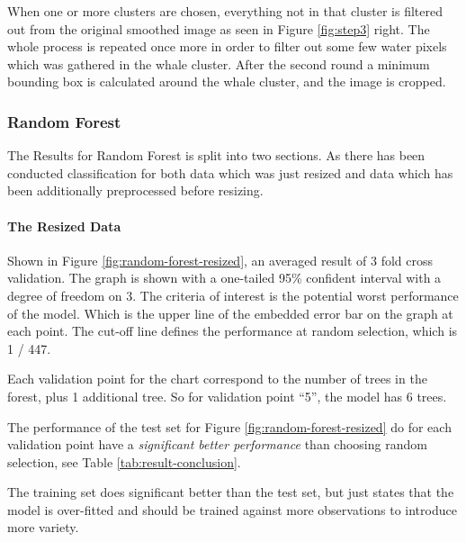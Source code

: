 When one or more clusters are chosen, everything not in that cluster is filtered out from the original smoothed image as seen in Figure \ref{fig:step3} right. The whole process is repeated once more in order to filter out some few water pixels which was gathered in the whale cluster.
After the second round a minimum bounding box is calculated around the whale cluster, and the image is cropped.



\subsubsection{Random Forest}
The Results for Random Forest is split into two sections. As there has been conducted classification for both data which was just resized and data which has been additionally preprocessed before resizing.

\paragraph{The Resized Data}
\label{par:rf-resized}
Shown in Figure \ref{fig:random-forest-resized}, an averaged result of 3 fold cross validation. The graph is shown with a one-tailed 95\% confident interval with a degree of freedom on 3. The criteria of interest is the potential worst performance of the model. Which is the upper line of the embedded error bar on the graph at each point. The cut-off line defines the performance at random selection, which is 1 / 447. 

Each validation point for the chart correspond to the number of trees in the forest, plus 1 additional tree. So for validation point ``5'', the model has 6 trees.

The performance of the test set for Figure \ref{fig:random-forest-resized} do for each validation point have a \emph{significant better performance} than choosing random selection, see Table \ref{tab:result-conclusion}.

The training set does significant better than the test set, but just states that the model is over-fitted and should be trained against more observations to introduce more variety.

